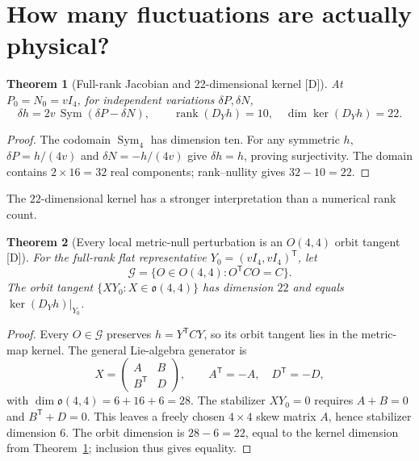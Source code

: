 \documentclass[11pt,a4paper]{article}
\newtheorem{theorem}{Theorem}[section]
\theoremstyle{definition}\newtheorem{definition}[theorem]{Definition}
\theoremstyle{remark}\newtheorem{remark}[theorem]{Remark}
\newcommand{\Dtag}{\textsf{[D]}}
\newcommand{\Sym}{\operatorname{Sym}}
\newcommand{\rank}{\operatorname{rank}}
\newcommand{\kerop}{\operatorname{ker}}
\begin{document}
\section{How many fluctuations are actually physical?}
\begin{theorem}[Full-rank Jacobian and 22-dimensional kernel \Dtag]\label{thm:rank}
At $P_0=N_0=vI_4$, for independent variations $\delta P,\delta N$,
\begin{equation}\label{eq:jac}
\boxed{\delta h=2v\,\Sym(\delta P-\delta N),\qquad
\rank(D_Y h)=10,\quad \dim\kerop(D_Yh)=22.}
\end{equation}
\end{theorem}
\begin{proof} The codomain $\operatorname{Sym}_4$ has dimension ten. For any symmetric $h$, $\delta P=h/(4v)$ and $\delta N=-h/(4v)$ give $\delta h=h$, proving surjectivity. The domain contains $2\times16=32$ real components; rank--nullity gives $32-10=22$.\end{proof}

The $22$-dimensional kernel has a stronger interpretation than a numerical rank count.
\begin{theorem}[Every local metric-null perturbation is an $O(4,4)$ orbit tangent \Dtag]\label{thm:orbit}
For the full-rank flat representative $Y_0=(vI_4,vI_4)^{\mathsf T}$, let
\begin{equation}
\mathcal G=\{O\in O(4,4):O^{\mathsf T}CO=C\}.
\end{equation}
The orbit tangent $\{XY_0:X\in\mathfrak o(4,4)\}$ has dimension $22$ and equals $\kerop(D_Yh)|_{Y_0}$.
\end{theorem}
\begin{proof}
Every $O\in\mathcal G$ preserves $h=Y^{\mathsf T}CY$, so its orbit tangent lies in the metric-map kernel. The general Lie-algebra generator is
\begin{equation}
 X=\begin{pmatrix}A&B\\B^{\mathsf T}&D\end{pmatrix},\qquad A^{\mathsf T}=-A,\quad D^{\mathsf T}=-D,
\end{equation}
with $\dim\mathfrak o(4,4)=6+16+6=28$. The stabilizer $XY_0=0$ requires $A+B=0$ and $B^{\mathsf T}+D=0$. This leaves a freely chosen $4\times4$ skew matrix $A$, hence stabilizer dimension $6$. The orbit dimension is $28-6=22$, equal to the kernel dimension from Theorem~\ref{thm:rank}; inclusion thus gives equality.
\end{proof}
\end{document}
